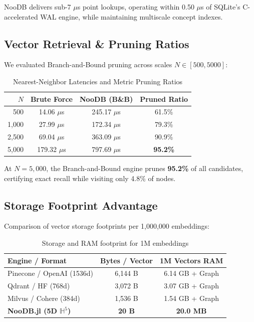 \documentclass[10pt,twocolumn,a4paper]{article}
\begin{document}
NooDB delivers sub-7 $\mu$s point lookups, operating within 0.50 $\mu$s of SQLite's C-accelerated WAL engine, while maintaining multiscale concept indexes.

\subsection{Vector Retrieval \& Pruning Ratios}
We evaluated Branch-and-Bound pruning across scales $N \in [500, 5000]$:

\begin{table}[h]
\centering
\small
\begin{tabular}{rccc}
\toprule
$N$ & \textbf{Brute Force} & \textbf{NooDB (B\&B)} & \textbf{Pruned Ratio} \\
\midrule
500  & 14.06 $\mu$s  & 245.17 $\mu$s & 61.5\% \\
1,000 & 27.99 $\mu$s & 172.34 $\mu$s & 79.3\% \\
2,500 & 69.04 $\mu$s & 363.09 $\mu$s & 90.9\% \\
5,000 & 179.32 $\mu$s & 797.69 $\mu$s & \textbf{95.2\%} \\
\bottomrule
\end{tabular}
\caption{Nearest-Neighbor Latencies and Metric Pruning Ratios}
\end{table}

At $N=5,000$, the Branch-and-Bound engine prunes \textbf{95.2\%} of all candidates, certifying exact recall while visiting only 4.8\% of nodes.

\subsection{Storage Footprint Advantage}
Comparison of vector storage footprints per 1,000,000 embeddings:

\begin{table}[h]
\centering
\small
\begin{tabular}{lcc}
\toprule
\textbf{Engine / Format} & \textbf{Bytes / Vector} & \textbf{1M Vectors RAM} \\
\midrule
Pinecone / OpenAI (1536d) & 6,144 B & 6.14 GB + Graph \\
Qdrant / HF (768d)        & 3,072 B & 3.07 GB + Graph \\
Milvus / Cohere (384d)     & 1,536 B & 1.54 GB + Graph \\
\textbf{NooDB.jl (5D $\mathbb{H}^5$)} & \textbf{20 B} & \textbf{20.0 MB} \\
\bottomrule
\end{tabular}
\caption{Storage and RAM footprint for 1M embeddings}
\end{table}
\end{document}
